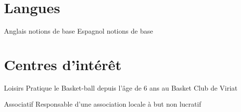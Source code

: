 \documentclass[10pt,a4paper]{moderncv}
\begin{document}
\section{Langues}

\cvcomputer
	{Anglais}
	{notions de base}
	{Espagnol}
	{notions de base}



\section{Centres d'intérêt}

\cvline
	{Loisirs}
	{Pratique le Basket-ball depuis l'âge de 6 ans au Basket Club de Viriat}

\cvline
	{Associatif}
	{Responsable d'une association locale à but non lucratif}

\end{document}
